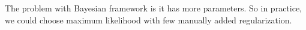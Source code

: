 The problem with Bayesian framework is it has more parameters. So in practice, we could choose maximum likelihood with few manually added regularization.





















































































































